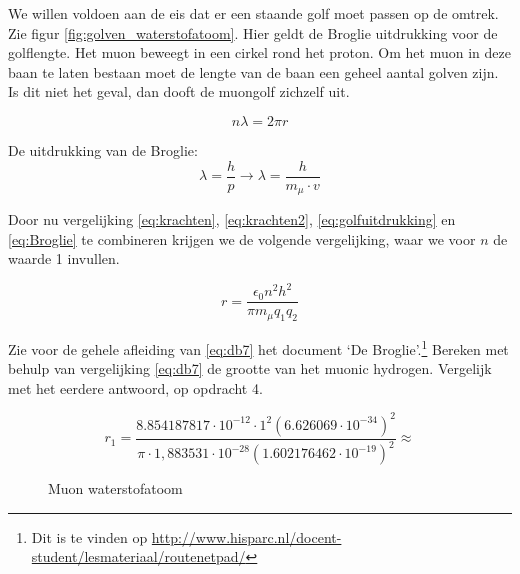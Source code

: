 \begin{questions}
We willen voldoen aan de eis dat er een staande golf moet passen op de omtrek. Zie 
figur \ref{fig:golven_waterstofatoom}.  Hier geldt de Broglie uitdrukking voor de golflengte.
Het muon beweegt in een cirkel rond het proton. Om het muon in 
deze baan te laten bestaan moet de lengte van de baan een geheel aantal golven zijn. 
Is dit niet het geval, dan dooft de muongolf zichzelf uit.


\begin{equation}
\label{eq:golfuitdrukking}
    n\lambda = 2\pi r 
\end{equation}

De uitdrukking van de Broglie:
\begin{equation} 
 \label{eq:Broglie}
 \lambda = \frac{h}{p} \rightarrow \lambda = \frac{h}{ m_{\mu} \cdot v} 
\end{equation}

Door nu vergelijking \ref{eq:krachten}, \ref{eq:krachten2}, \ref{eq:golfuitdrukking} en \ref{eq:Broglie}
te combineren krijgen we de volgende vergelijking, waar we voor $n$ de waarde 1 invullen.

\begin{equation} \label{eq:db7}
r=\frac{\epsilon_{0}n^{2}h^{2}}{\pi m_{\mu} q_{1}q_{2}}
\end{equation}

Zie voor de gehele afleiding van \ref{eq:db7}
het document `De Broglie'.\footnote{Dit is te vinden op \url{http://www.hisparc.nl/docent-student/lesmateriaal/routenetpad/}
}
\question
Bereken met behulp van vergelijking \ref{eq:db7} de grootte van het muonic hydrogen.
Vergelijk met het eerdere antwoord, op opdracht 4.
\begin{solution} 
 
\begin{equation}
r_{1}=\frac{8.854187817 \cdot 10^{-12} \cdot 1^{2}\left(6.626069 \cdot 10^{-34}\right)^{2}}
{\pi \cdot 1,883531 \cdot10^{-28}\left(1.602176462 \cdot 10^{-19}\right)^{2}}\approx 
\end{equation}
\end{solution} 

\begin{figure}[h]
\centering
{}
\caption{Muon waterstofatoom}
\label{fig:Muon_waterstofatoom}
\end{figure}


\end{questions}
